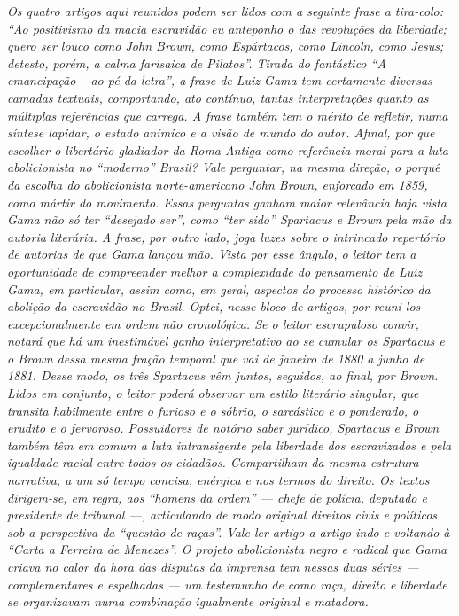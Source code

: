 \begin{didas}
\emph{Os quatro artigos aqui reunidos podem ser lidos com a seguinte
frase a tira-colo: ``Ao positivismo da macia escravidão eu anteponho o
das revoluções da liberdade; quero ser louco como John Brown, como
Espártacos, como Lincoln, como Jesus; detesto, porém, a calma farisaica
de Pilatos''. Tirada do fantástico ``A emancipação -- ao pé da
letra'', a frase de Luiz Gama tem certamente diversas camadas
textuais, comportando, ato contínuo, tantas interpretações quanto as
múltiplas referências que carrega. A frase também tem o mérito de
refletir, numa síntese lapidar, o estado anímico e a visão de mundo do
autor. Afinal, por que escolher o libertário gladiador da Roma Antiga
como referência moral para a luta abolicionista no ``moderno'' Brasil?
Vale perguntar, na mesma direção, o porquê da escolha do abolicionista
norte-americano John Brown, enforcado em 1859, como mártir do movimento.
Essas perguntas ganham maior relevância haja vista Gama não só ter
``desejado ser'', como ``ter sido'' Spartacus e Brown pela mão da autoria
literária. A frase, por outro lado, joga luzes sobre o intrincado
repertório de autorias de que Gama lançou mão. Vista por esse ângulo, o
leitor tem a oportunidade de compreender melhor a complexidade do
pensamento de Luiz Gama, em particular, assim como, em geral, aspectos
do  processo histórico da abolição da escravidão no Brasil. Optei, nesse
bloco de artigos, por reuni-los excepcionalmente em ordem não
cronológica. Se o leitor escrupuloso convir, notará que há um
inestimável ganho interpretativo ao se cumular os Spartacus e o
Brown dessa mesma fração temporal que vai de janeiro de 1880 a
junho de 1881. Desse modo, os três Spartacus vêm juntos,
seguidos, ao final, por Brown. Lidos em conjunto, o leitor poderá
observar um estilo literário singular, que transita habilmente entre o
furioso e o sóbrio, o sarcástico e o ponderado, o erudito e o fervoroso.
Possuidores de notório saber jurídico, Spartacus e Brown
também têm em comum a luta intransigente pela liberdade dos
escravizados e pela igualdade racial entre todos os cidadãos.
Compartilham da mesma estrutura narrativa, a um só tempo concisa,
enérgica e nos termos do direito. Os textos dirigem-se, em regra, aos
``homens da ordem'' --- chefe de polícia, deputado e presidente de tribunal
---, articulando de modo original direitos civis e políticos sob a
perspectiva da ``questão de raças''. Vale ler artigo a artigo indo e
voltando à ``Carta a Ferreira de Menezes''. O projeto abolicionista negro e
radical que Gama criava no calor da hora das disputas da imprensa tem
nessas duas séries --- complementares e espelhadas --- um testemunho de
como raça, direito e liberdade se organizavam numa combinação igualmente
original e matadora.}
\end{didas}

